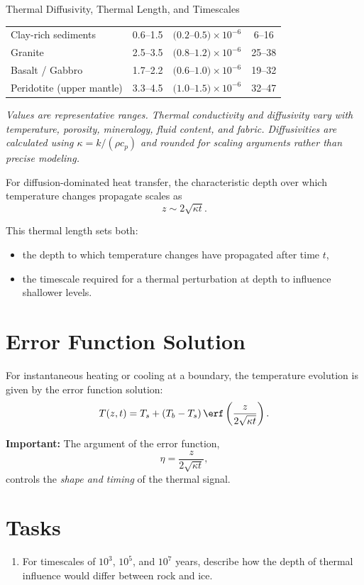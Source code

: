 \begin{activity}{Thermal Diffusivity, Thermal Length, and Timescales}
\begin{table}
\begin{tabular}{lccc}
        Clay-rich sediments &
        0.6--1.5 &
        $(0.2$--$0.5)\times10^{-6}$ &
        6--16 \\

        Granite &
        2.5--3.5 &
        $(0.8$--$1.2)\times10^{-6}$ &
        25--38 \\

        Basalt / Gabbro &
        1.7--2.2 &
        $(0.6$--$1.0)\times10^{-6}$ &
        19--32 \\

        Peridotite (upper mantle) &
        3.3--4.5 &
        $(1.0$--$1.5)\times10^{-6}$ &
        32--47 \\
        \bottomrule
    \end{tabular}
\end{table}

\smallskip
\noindent
\textit{Values are representative ranges. Thermal conductivity and diffusivity
vary with temperature, porosity, mineralogy, fluid content, and fabric.
Diffusivities are calculated using $\kappa = k/(\rho c_p)$ and rounded for
scaling arguments rather than precise modeling.}

For diffusion-dominated heat transfer, the characteristic depth over which temperature changes propagate scales as
\[
z \sim 2 \sqrt{\kappa t}.
\]

This thermal length sets both:
\begin{itemize}
  \item the depth to which temperature changes have propagated after time $t$,
  \item the timescale required for a thermal perturbation at depth to influence
  shallower levels.
\end{itemize}

\section*{Error Function Solution}

For instantaneous heating or cooling at a boundary, the temperature evolution is given by the error function solution:
\[
T(z,t) = T_s + (T_b - T_s)\,
\erf \left(\frac{z}{2\sqrt{\kappa t}}\right).
\]

\textbf{Important:}  
The argument of the error function,
\[
\eta = \frac{z}{2\sqrt{\kappa t}},
\]
controls the \emph{shape and timing} of the thermal signal.



\section*{Tasks}
\begin{enumerate}
  \item For timescales of $10^3$, $10^5$, and $10^7$ years, describe how the depth of thermal influence would differ between rock and ice.
  \answerbox[3cm]


\end{enumerate}
\end{activity}
